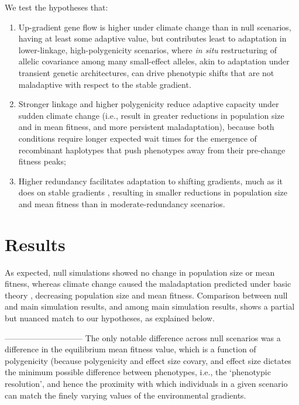 \documentclass[9pt,twocolumn,twoside,lineno]{pnas-new}
\begin{document}
\begin{figure}
\label{fig:fig_1}
\end{figure}


We test the hypotheses that:
\begin{enumerate}
    \item Up-gradient gene flow is higher under climate change than in null scenarios, having at least some adaptive value, but contributes least to adaptation in lower-linkage, high-polygenicity scenarios, where \textit{in situ} restructuring of allelic covariance among many small-effect alleles, akin to adaptation under transient genetic architectures, can drive phenotypic shifts that are not maladaptive with respect to the stable gradient.
    \item Stronger linkage and higher polygenicity reduce adaptive capacity under sudden climate change (i.e.,  result in greater reductions in population size and in mean fitness, and more persistent maladaptation), because both conditions require longer expected wait times for the emergence of recombinant haplotypes that push phenotypes away from their pre-change fitness peaks;
    \item Higher redundancy facilitates adaptation to shifting gradients, much as it does on stable gradients \cite{barghi_redundancy,manceau,yeaman_amnat}, resulting in smaller reductions in population size and mean fitness than in moderate-redundancy scenarios.
\end{enumerate}




\section*{Results}

As expected, null simulations showed no change in population size or mean fitness,
whereas climate change caused the maladaptation predicted under basic theory
\cite{aitken_whitlock},
decreasing population size and mean fitness.
Comparison between null and main simulation results, and among main simulation results,
shows a partial but nuanced match to our hypotheses, as explained below.



-----------------------------
The only notable difference across null scenarios was a difference in the 
equilibrium mean fitness value, which is a function of polygenicity
(because polygenicity and effect size covary,
and effect size dictates the minimum possible difference between phenotypes,
i.e., the `phenotypic resolution', and hence the proximity with which individuals in a given scenario can 
match the finely varying values of the environmental gradients.
\end{document}
